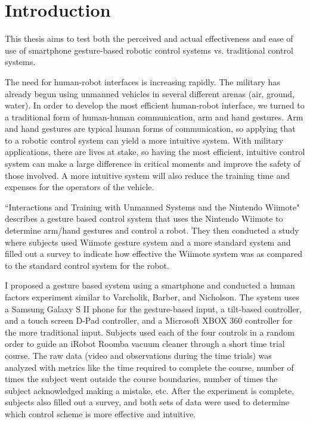 \documentclass[12pt,a4paper]{report}
\begin{document}
\chapter{Introduction}
\pagestyle{headings}
\setcounter{page}{1}

This thesis aims to test both the perceived and actual effectiveness and ease of use of smartphone gesture-based robotic control systems vs. traditional control systems.

The need for human-robot interfaces is increasing rapidly. The military has already begun using unmanned vehicles in several different arenas (air, ground, water). In order to develop the most efficient human-robot interface, we turned to a traditional form of human-human communication, arm and hand gestures. Arm and hand gestures are typical human forms of communication, so applying that to a robotic control system can yield a more intuitive system. With military applications, there are lives at stake, so having the most efficient, intuitive control system can make a large difference in critical moments and improve the safety of those involved. A more intuitive system will also reduce the training time and expenses for the operators of the vehicle.

``Interactions and Training with Unmanned Systems and the Nintendo Wiimote" \cite{Varcholik_Barber_Nicholson_2008} describes a gesture based control system that uses the Nintendo Wiimote to determine arm/hand gestures and control a robot. They then conducted a study where subjects used Wiimote gesture system and a more standard system and filled out a survey to indicate how effective the Wiimote system was as compared to the standard control system for the robot.

I proposed a gesture based system using a smartphone and conducted a human factors experiment similar to Varcholik, Barber, and Nicholson. The system uses a Samsung Galaxy S II phone for the gesture-based input, a tilt-based controller, and a touch screen D-Pad controller, and a Microsoft XBOX 360 controller for the more traditional input. Subjects used each of the four controls in a random order to guide an iRobot Roomba vacuum cleaner through a short time trial course. The raw data (video and observations during the time trials) was analyzed with metrics like the time required to complete the course, number of times the subject went outside the course boundaries, number of times the subject acknowledged making a mistake, etc. After the experiment is complete, subjects also filled out a survey, and both sets of data were used to determine which control scheme is more effective and intuitive. 
\end{document}
